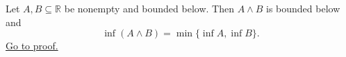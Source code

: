 \begin{theorem}
\label{thm:infimum-pairwise-minimum-set}
Let $A,B\subseteq\mathbb{R}$ be nonempty and bounded below. Then $A\wedge B$
is bounded below and
\[
\inf(A\wedge B)=\min\{\inf A,\inf B\}.
\]
\hyperref[prf:infimum-pairwise-minimum-set]{Go to proof.}
\end{theorem}